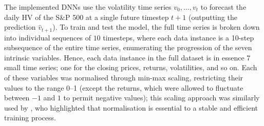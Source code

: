 \documentclass[a4paper, 11pt]{report}
\begin{document}




    The implemented DNNs use the volatility time series $v_0, \ldots, v_t$ to forecast the daily HV of the S\&P 500 at a single future timestep $t+1$ (outputting the prediction $\hat{v}_{t+1}$). To train and test the model, the full time series is broken down into individual sequences of $10$ timesteps, where each data instance is a 10-step subsequence of the entire time series, enumerating the progression of the seven intrinsic variables. Hence, each data instance in the full dataset is in essence $7$ small time series; one for the closing prices, returns, volatilities, and so on. Each of these variables was normalised through min-max scaling, restricting their values to the range 0--1 (except the returns, which were allowed to fluctuate between $-1$ and $1$ to permit negative values); this scaling approach was similarly used by \citet{rodikov-2022}, who highlighted that normalisation is essential to a stable and efficient training process.
\end{document}
